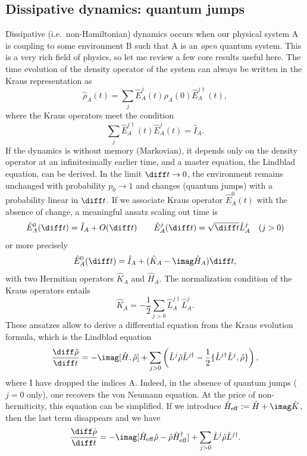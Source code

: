 \subsection{Dissipative dynamics: quantum jumps}
Dissipative (i.e.\ non-Hamiltonian) dynamics occurs when our physical system A is coupling to some environment B such that A is an {\em open} quantum system. This is a very rich field of physics, so let me review a few core results useful here. The time evolution of the density operator of the system can always be written in the Kraus representation as
\begin{equation}
\hat{\rho}_A (t) = \sum_j \hat{E}_A^j(t) \hat{\rho}_A (0) \hat{E}_A^{j\dagger}(t),
\end{equation}
where the Kraus operators meet the condition 
\begin{equation}
\sum_j \hat{E}_A^{j\dagger}(t) \hat{E}_A^j(t) = \hat{I}_A .
\end{equation}
If the dynamics is without memory (Markovian), it depends only on the density operator at an infinitesimally earlier time, and a master equation, the Lindblad equation, can be derived. In the limit $\diff t\rightarrow 0$, the environment remains unchanged with probability $p_0 \rightarrow 1$ and changes (quantum jumps) with a probability linear in $\diff t$. If we associate Kraus operator $\hat{E}_A^0(t)$ with the absence of change, a meaningful ansatz scaling out time is
\begin{equation}
\hat{E}_A^0(\diff t) = \hat{I}_A + O(\diff t) \quad\quad \hat{E}_A^j(\diff t) = \sqrt{\diff t} \hat{L}_A^j  \quad (j>0)
\end{equation}
or more precisely
\begin{equation}
\hat{E}_A^0(\diff t) = \hat{I}_A + (\hat{K}_A - \imag \hat{H}_A) \diff t ,
\end{equation}
with two Hermitian operators $\hat{K}_A$ and $\hat{H}_A$. The normalization condition of the Kraus operators entails 
\begin{equation}
\hat{K}_A = -\frac{1}{2} \sum_{j>0} \hat{L}_A^{j\dagger} \hat{L}_A^j .
\end{equation}
These ansatzes allow to derive a differential equation from the Kraus evolution formula, which is the Lindblad equation
\begin{equation}
\frac{\diff \hat{\rho}}{\diff t} = - \imag [\hat{H},\hat{\rho}] + \sum_{j>0} \left( \hat{L}^j \hat{\rho} \hat{L}^{j\dagger} - \frac{1}{2} \{ \hat{L}^{j\dagger} \hat{L}^j, \hat{\rho} \} \right) ,
\end{equation} 
where I have dropped the indices A. Indeed, in the absence of  quantum jumps ($j=0$ only), one recovers the von Neumann equation. At the price of non-hermiticity, this equation can be simplified. If we introduce $\hat{H}_{{\rm eff}} := \hat{H} + \imag \hat{K}$, then the last term disappears and we have
\begin{equation}
\frac{\diff \hat{\rho}}{\diff t} = - \imag [\hat{H}_{{\rm eff}}\hat{\rho}-\hat{\rho}\hat{H}_{{\rm eff}}^\dagger] + \sum_{j>0} \hat{L}^j \hat{\rho} \hat{L}^{j\dagger} .
\label{eq:Lindblad2}
\end{equation} 

